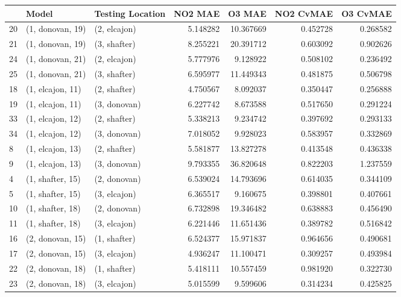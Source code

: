 \begin{tabular}{lllrrrr}
\toprule
{} &             Model & Testing Location &   NO2 MAE &     O3 MAE &  NO2 CvMAE &  O3 CvMAE \\
\midrule
20 &  (1, donovan, 19) &     (2, elcajon) &  5.148282 &  10.367669 &   0.452728 &  0.268582 \\
21 &  (1, donovan, 19) &     (3, shafter) &  8.255221 &  20.391712 &   0.603092 &  0.902626 \\
24 &  (1, donovan, 21) &     (2, elcajon) &  5.777976 &   9.128922 &   0.508102 &  0.236492 \\
25 &  (1, donovan, 21) &     (3, shafter) &  6.595977 &  11.449343 &   0.481875 &  0.506798 \\
18 &  (1, elcajon, 11) &     (2, shafter) &  4.750567 &   8.092037 &   0.350447 &  0.256888 \\
19 &  (1, elcajon, 11) &     (3, donovan) &  6.227742 &   8.673588 &   0.517650 &  0.291224 \\
33 &  (1, elcajon, 12) &     (2, shafter) &  5.338213 &   9.234742 &   0.397692 &  0.293133 \\
34 &  (1, elcajon, 12) &     (3, donovan) &  7.018052 &   9.928023 &   0.583957 &  0.332869 \\
8  &  (1, elcajon, 13) &     (2, shafter) &  5.581877 &  13.827278 &   0.413548 &  0.436338 \\
9  &  (1, elcajon, 13) &     (3, donovan) &  9.793355 &  36.820648 &   0.822203 &  1.237559 \\
4  &  (1, shafter, 15) &     (2, donovan) &  6.539024 &  14.793696 &   0.614035 &  0.344109 \\
5  &  (1, shafter, 15) &     (3, elcajon) &  6.365517 &   9.160675 &   0.398801 &  0.407661 \\
10 &  (1, shafter, 18) &     (2, donovan) &  6.732898 &  19.346482 &   0.638883 &  0.456490 \\
11 &  (1, shafter, 18) &     (3, elcajon) &  6.221446 &  11.651436 &   0.389782 &  0.516842 \\
16 &  (2, donovan, 15) &     (1, shafter) &  6.524377 &  15.971837 &   0.964656 &  0.490681 \\
17 &  (2, donovan, 15) &     (3, elcajon) &  4.936247 &  11.100471 &   0.309257 &  0.493984 \\
22 &  (2, donovan, 18) &     (1, shafter) &  5.418111 &  10.557459 &   0.981920 &  0.322730 \\
23 &  (2, donovan, 18) &     (3, elcajon) &  5.015599 &   9.599606 &   0.314234 &  0.425825 \\

\end{tabular}

